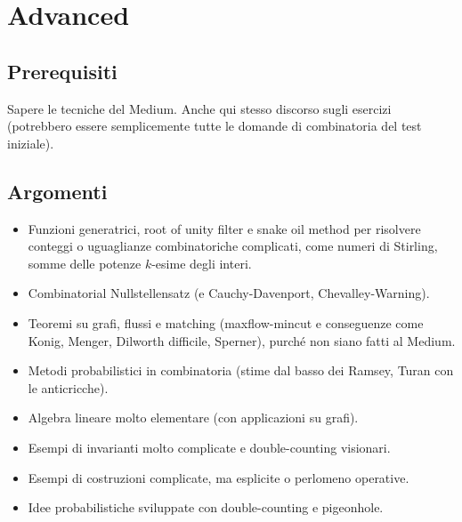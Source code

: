 \documentclass[a4paper,10pt]{article}
\begin{document}
\section{Advanced}
\subsection{Prerequisiti}
Sapere le tecniche del Medium. Anche qui stesso discorso sugli esercizi (potrebbero essere semplicemente tutte le domande di combinatoria del test iniziale).

\subsection{Argomenti}
\begin{itemize}
	\item Funzioni generatrici, root of unity filter e snake oil method per risolvere conteggi o uguaglianze combinatoriche complicati, come numeri di Stirling, somme delle potenze $k$-esime degli interi.
	\item Combinatorial Nullstellensatz (e Cauchy-Davenport, Chevalley-Warning).
	\item Teoremi su grafi, flussi e matching (maxflow-mincut e conseguenze come Konig, Menger, Dilworth difficile, Sperner), purché non siano fatti al Medium.
	\item Metodi probabilistici in combinatoria (stime dal basso dei Ramsey, Turan con le anticricche).
	\item Algebra lineare molto elementare (con applicazioni su grafi).
	\item Esempi di invarianti molto complicate e double-counting visionari.
	\item Esempi di costruzioni complicate, ma esplicite o perlomeno operative.
	\item Idee probabilistiche sviluppate con double-counting e pigeonhole.
\end{itemize}
\end{document}
